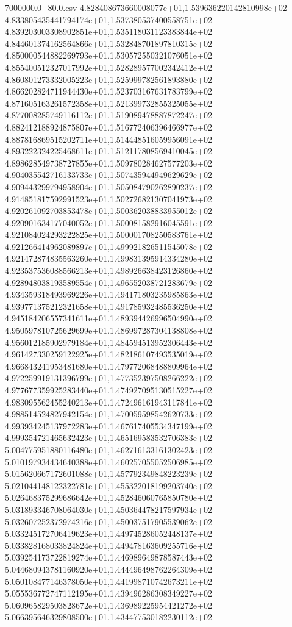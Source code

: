 \begin{filecontents*}{7000000.0_80.0.csv}
4.828408673660008077e+01,1.539636220142810998e+02
4.833805435441794174e+01,1.537380537400558751e+02
4.839203003308902851e+01,1.535118031123383844e+02
4.844601374162564866e+01,1.532848701897810315e+02
4.850000544882269793e+01,1.530572550321076051e+02
4.855400512327017992e+01,1.528289577002342412e+02
4.860801273332005223e+01,1.525999782561893880e+02
4.866202824711944430e+01,1.523703167631783799e+02
4.871605163261572358e+01,1.521399732855325055e+02
4.877008285749116112e+01,1.519089478887872247e+02
4.882412188924875807e+01,1.516772406396466977e+02
4.887816869515202711e+01,1.514448516059956091e+02
4.893222324225468611e+01,1.512117808569410045e+02
4.898628549738727855e+01,1.509780284627577203e+02
4.904035542716133733e+01,1.507435944949629629e+02
4.909443299794958904e+01,1.505084790262890237e+02
4.914851817592991523e+01,1.502726821307041973e+02
4.920261092703853478e+01,1.500362038833955012e+02
4.920901634177040052e+01,1.500081582916045591e+02
4.921084024293222825e+01,1.500001708250583761e+02
4.921266414962089897e+01,1.499921826511545078e+02
4.921472874835563260e+01,1.499831395914334280e+02
4.923537536088566213e+01,1.498926638423126860e+02
4.928948038193589554e+01,1.496552038721283679e+02
4.934359318493969226e+01,1.494171803235985863e+02
4.939771375212321658e+01,1.491785932485536250e+02
4.945184206557341611e+01,1.489394426996504990e+02
4.950597810725629699e+01,1.486997287304138808e+02
4.956012185902979184e+01,1.484594513952306443e+02
4.961427330259122925e+01,1.482186107493535019e+02
4.966843241953481680e+01,1.479772068488809964e+02
4.972259919131396799e+01,1.477352397508266222e+02
4.977677359925283440e+01,1.474927095130515227e+02
4.983095562455240213e+01,1.472496161943117841e+02
4.988514524827942154e+01,1.470059598542620733e+02
4.993934245137972283e+01,1.467617405534347199e+02
4.999354721465632423e+01,1.465169583532706383e+02
5.004775951880116480e+01,1.462716133161302423e+02
5.010197934434640388e+01,1.460257055052506985e+02
5.015620667172601088e+01,1.457792349848223239e+02
5.021044148122322781e+01,1.455322018199203740e+02
5.026468375299686642e+01,1.452846060765850780e+02
5.031893346708064030e+01,1.450364478217597934e+02
5.032607252372974216e+01,1.450037517905539062e+02
5.033245172706419623e+01,1.449745286052448137e+02
5.033828168033824824e+01,1.449478163609255716e+02
5.039254173722819274e+01,1.446989649878587443e+02
5.044680943781160920e+01,1.444496498762264309e+02
5.050108477146378050e+01,1.441998710742673211e+02
5.055536772747112195e+01,1.439496286308349227e+02
5.060965829503828672e+01,1.436989225954421272e+02
5.066395646329808500e+01,1.434477530182230112e+02

\end{filecontents*}

